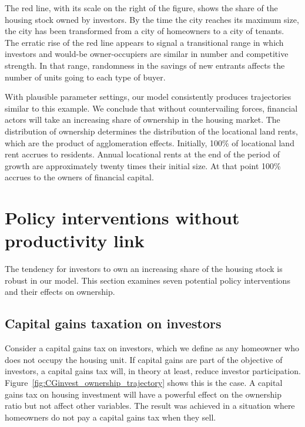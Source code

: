 The red line, with its scale on the right of the figure, shows the share of the housing stock owned by investors. By the time the city reaches its maximum size, the city has been transformed from a city of homeowners to a city of tenants. The erratic rise of the red line appears to signal a transitional range in which investors and would-be owner-occupiers are similar in number and competitive strength. In that range, randomness in the savings of new entrants affects the number of units going to each type of buyer. 

With plausible parameter settings, our model consistently produces trajectories similar to this example. We conclude that without countervailing forces, financial actors will take an increasing share of ownership in the housing market. 
The distribution of ownership determines the distribution of the locational land rents, which are the product of agglomeration effects. 
Initially, 100\% of locational land rent accrues to residents.   Annual locational rents at the end of the period of growth are approximately twenty times their initial size. At that point 100\% accrues to the owners of financial capital. %



\section{Policy interventions without productivity link}

The tendency for investors to own an increasing share of the housing stock is robust in our model. This section examines seven potential policy interventions and their effects on ownership. 

\newpage
\subsection{Capital gains taxation on investors}

Consider a capital gains tax on investors, which we define as any homeowner who does not occupy the housing unit. If capital gains are part of the objective of investors, a capital gains tax will, in theory at least, reduce investor participation. Figure~\ref{fig:CGinvest_ownership_trajectory} shows this is the case. A capital gains tax on housing investment will have a powerful effect on the ownership ratio but not affect other variables. The result was achieved in a situation where homeowners do not pay a capital gains tax when they sell. 


